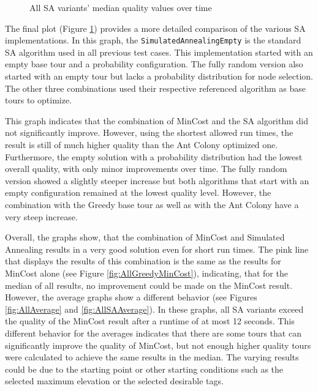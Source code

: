 \begin{figure}
	\centering
	
	\caption{All SA variants' median quality values over time}
	\label{fig:AllOverTimeSA}
\end{figure}


The final plot (Figure \ref{fig:AllOverTimeSA}) provides a more detailed comparison of the various SA implementations. 
In this graph, the \texttt{SimulatedAnnealingEmpty} is the standard SA algorithm used in all previous test cases.
This implementation started with an empty base tour and a probability configuration.
The fully random version also started with an empty tour but lacks a probability distribution for node selection.
The other three combinations used their respective referenced algorithm as base tours to optimize.

This graph indicates that the combination of MinCost and the SA algorithm did not significantly improve. 
However, using the shortest allowed run times, the result is still of much higher quality than the Ant Colony optimized one.
Furthermore, the empty solution with a probability distribution had the lowest overall quality, with only minor improvements over time.
The fully random version showed a slightly steeper increase but both algorithms that start with an empty configuration remained at the lowest quality level.
However, the combination with the Greedy base tour as well as with the Ant Colony have a very steep increase. 

Overall, the graphs show, that the combination of MinCost and Simulated Annealing results in a very good solution even for short run times.
The pink line that displays the results of this combination is the same as the results for MinCost alone (see Figure \ref{fig:AllGreedyMinCost}), indicating, that for the median of all results, no improvement could be made on the MinCost result.
However, the average graphs show a different behavior (see Figures \ref{fig:AllAverage} and \ref{fig:AllSAAverage}).
In these graphs, all SA variants exceed the quality of the MinCost result after a runtime of at most 12 seconds.
This different behavior for the averages indicates that there are some tours that can significantly improve the quality of MinCost, but not enough higher quality tours were calculated to achieve the same results in the median.
The varying results could be due to the starting point or other starting conditions such as the selected maximum elevation or the selected desirable tags.

